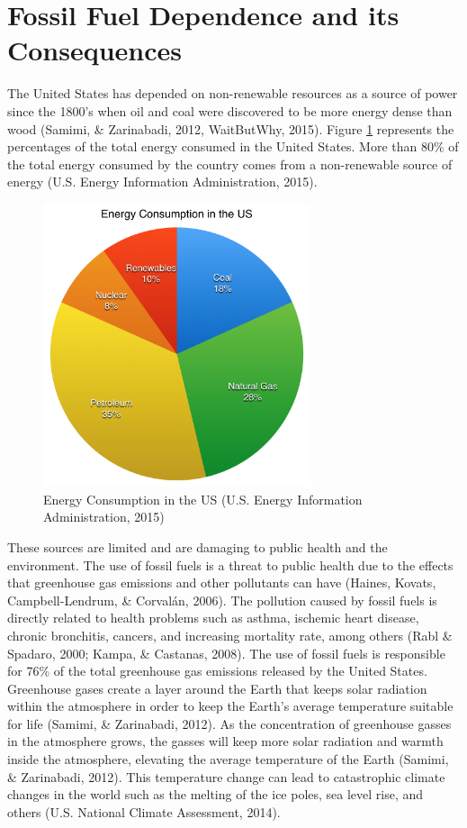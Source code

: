  \section {Fossil Fuel Dependence and its Consequences}
  \par The United States has depended on non-renewable resources as a source of power since the 1800's when oil and coal were discovered to be more energy dense than wood (Samimi, \& Zarinabadi, 2012, WaitButWhy, 2015). Figure \ref{fig:pie} represents the percentages of the total energy consumed in the United States. More than 80\% of the total energy consumed by the country comes from a non-renewable source of energy (U.S. Energy Information Administration, 2015).
  \begin{figure}[H]
    \centering
      \includegraphics[width=0.70\textwidth]{images/01-EnergyConsuptionPieChart}
    \caption{Energy Consumption in the US (U.S. Energy Information Administration, 2015)}
    \label{fig:pie}
  \end{figure}
  \par These sources are limited and are damaging to public health and the environment. The use of fossil fuels is a threat to public health due to the effects that greenhouse gas emissions and other pollutants can have (Haines, Kovats, Campbell-Lendrum, \& Corvalán, 2006).  The pollution caused by fossil fuels is directly related to health problems such as asthma, ischemic heart disease, chronic bronchitis, cancers, and increasing mortality rate, among others (Rabl \& Spadaro, 2000; Kampa, \& Castanas, 2008). The use of fossil fuels is responsible for 76\% of the total greenhouse gas emissions released by the United States. Greenhouse gases create a layer around the Earth that keeps solar radiation within the atmosphere in order to keep the Earth's average temperature suitable for life (Samimi, \& Zarinabadi, 2012).  As the concentration of greenhouse gasses in the atmosphere grows, the gasses will keep more solar radiation and warmth inside the atmosphere, elevating the average temperature of the Earth (Samimi, \& Zarinabadi, 2012). This temperature change can lead to catastrophic climate changes in the world such as the melting of the ice poles, sea level rise, and others (U.S. National Climate Assessment, 2014).
